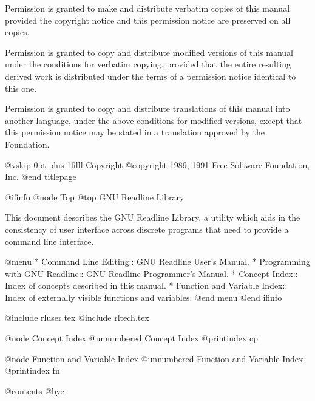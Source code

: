 Permission is granted to make and distribute verbatim copies of
this manual provided the copyright notice and this permission notice
are preserved on all copies.

Permission is granted to copy and distribute modified versions of this
manual under the conditions for verbatim copying, provided that the entire
resulting derived work is distributed under the terms of a permission
notice identical to this one.

Permission is granted to copy and distribute translations of this manual
into another language, under the above conditions for modified versions,
except that this permission notice may be stated in a translation approved
by the Foundation.

@vskip 0pt plus 1filll
Copyright @copyright{} 1989, 1991 Free Software Foundation, Inc.
@end titlepage

@ifinfo
@node Top
@top GNU Readline Library

This document describes the GNU Readline Library, a utility which aids
in the consistency of user interface across discrete programs that need
to provide a command line interface.

@menu
* Command Line Editing::	   GNU Readline User's Manual.
* Programming with GNU Readline::  GNU Readline Programmer's Manual.
* Concept Index::		   Index of concepts described in this manual.
* Function and Variable Index::	   Index of externally visible functions
				   and variables.
@end menu
@end ifinfo

@include rluser.tex
@include rltech.tex

@node Concept Index
@unnumbered Concept Index
@printindex cp

@node Function and Variable Index
@unnumbered Function and Variable Index
@printindex fn

@contents
@bye
